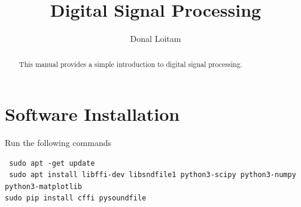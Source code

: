 \documentclass[journal,12pt,twocolumn]{IEEEtran}
\renewcommand\thesection{\arabic{section}}
\begin{document}

\def\putbox#1#2#3{\makebox[0in][l]{\makebox[#1][l]{}\raisebox{\baselineskip}[0in][0in]{\raisebox{#2}[0in][0in]{#3}}}}
     \def\rightbox#1{\makebox[0in][r]{#1}}
     \def\centbox#1{\makebox[0in]{#1}}
     \def\topbox#1{\raisebox{-\baselineskip}[0in][0in]{#1}}
     \def\midbox#1{\raisebox{-0.5\baselineskip}[0in][0in]{#1}}

\vspace{3cm}

\title{Digital Signal Processing}

\author{Donal Loitam} 

\maketitle


\tableofcontents


\renewcommand{\thefigure}{\theenumi}
\renewcommand{\thetable}{\theenumi}



\bigskip

\begin{abstract}
This manual provides a simple introduction to digital signal processing.
\end{abstract}
\noindent \section{Software Installation}
\noindent Run the following commands
\begin{lstlisting}
 sudo apt -get update 
 sudo apt install libffi-dev libsndfile1 python3-scipy python3-numpy python3-matplotlib 
sudo pip install cffi pysoundfile 
\end{lstlisting}
\end{document}
